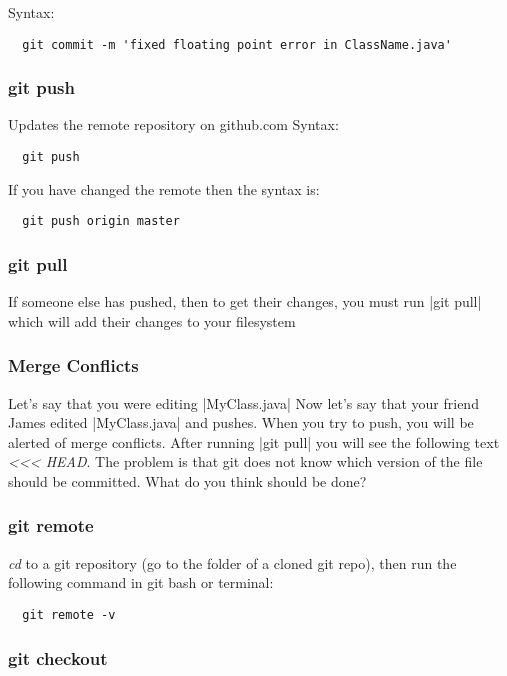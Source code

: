 \documentclass[11pt,fleqn]{article}
\begin{document}
Syntax:
\begin{verbatim}
  git commit -m 'fixed floating point error in ClassName.java'
\end{verbatim}

\subsubsection{git push}

Updates the remote repository on github.com
Syntax:
\begin{verbatim}
  git push
\end{verbatim}

If you have changed the remote then the syntax is:
\begin{verbatim}
  git push origin master
\end{verbatim}

\subsubsection{git pull}

If someone else has pushed, then to get their changes, you must run |git pull| which will add their changes to your filesystem
    \subsubsection{Merge Conflicts}
    Let's say that you were editing |MyClass.java|
    Now let's say that your friend James edited |MyClass.java| and pushes. When you try to push, you will be alerted of merge conflicts. After running |git pull| you will see the following text \textit{<<< HEAD}. The problem is that git does not know which version of the file should be committed. What do you think should be done?

\subsubsection{git remote}

\textit{cd} to a git repository (go to the folder of a cloned git repo), then run the following command in git bash or terminal:
\begin{verbatim}
  git remote -v
\end{verbatim}

\subsubsection{git checkout}
\end{document}
